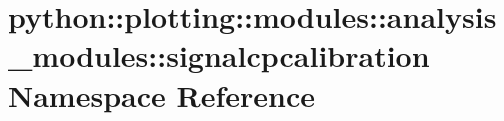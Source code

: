 \hypertarget{namespacepython_1_1plotting_1_1modules_1_1analysis__modules_1_1signalcpcalibration}{
\section{python::plotting::modules::analysis\_\-modules::signalcpcalibration Namespace Reference}
\label{namespacepython_1_1plotting_1_1modules_1_1analysis__modules_1_1signalcpcalibration}
}
